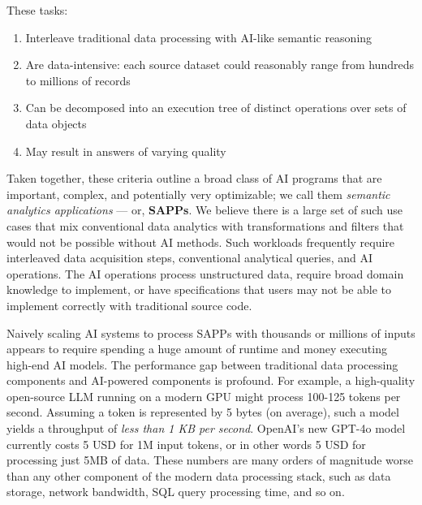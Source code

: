 These tasks:
\begin{enumerate}
    \item Interleave traditional data processing with AI-like semantic reasoning
    \item Are data-intensive: each source dataset could reasonably range from hundreds to millions of records
    \item Can be decomposed into an execution tree of distinct operations over sets of data objects
    \item May result in answers of varying quality
\end{enumerate}

 Taken together, these criteria outline a broad class of AI programs that are important, complex, and potentially very optimizable; we call them {\em semantic analytics applications} --- or, \textbf{SAPPs}. We believe there is a large set of such use cases that mix conventional data analytics with transformations and filters that would not be possible without AI methods. Such workloads frequently require interleaved data acquisition steps, conventional analytical queries, and AI operations. The AI operations process unstructured data, require broad domain knowledge to implement, or have specifications that users may not be able to implement correctly with traditional source code. %

 Naively scaling AI systems to process SAPPs with thousands or millions of inputs appears to require spending a huge amount of runtime and money executing high-end AI models. The performance gap between traditional data processing components and AI-powered components is profound.  For example, a high-quality open-source LLM running on a modern GPU might process 100-125 tokens per second. Assuming a token is represented by 5 bytes (on average), such a model yields a throughput of {\em less than 1 KB per second}. OpenAI's new GPT-4o model currently costs 5 USD for 1M input tokens, or in other words 5 USD for processing just 5MB of data. These numbers are many orders of magnitude worse than any other component of the modern data processing stack, such as data storage, network bandwidth, SQL query processing time, and so on.

